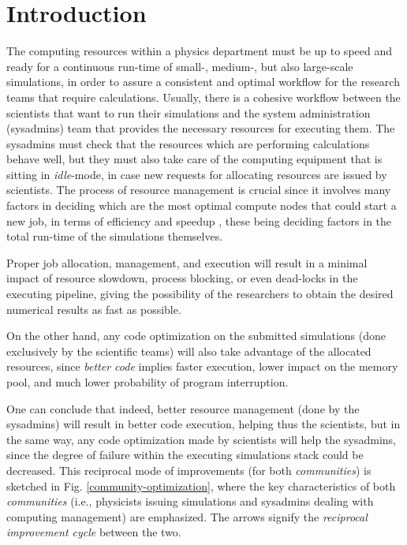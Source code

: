 \documentclass[conference]{IEEEtran}
\begin{document}
\section{Introduction}
\label{section-introduction}
The computing resources within a physics department must be up to speed and ready for a continuous run-time of small-, medium-, but also large-scale simulations, in order to assure a consistent and optimal workflow for the research teams that require calculations. Usually, there is a cohesive workflow between the scientists that want to run their simulations and the system administration (sysadmins) team that provides the necessary resources for executing them. The sysadmins must check that the resources which are performing calculations behave well, but they must also take care of the computing equipment that is sitting in \emph{idle}-mode, in case new requests for allocating resources are issued by scientists. The process of resource management is crucial since it involves many factors in deciding which are the most optimal compute nodes that could start a new job, in terms of efficiency and speedup \cite{paya2015resource}, these being deciding factors in the total run-time of the simulations themselves.
\par Proper job allocation, management, and execution will result in a minimal impact of resource slowdown, process blocking, or even dead-locks in the executing pipeline, giving the possibility of the researchers to obtain the desired numerical results as fast as possible. 
\par On the other hand, any code optimization \cite{codeoptimization2,codeoptimization1} on the submitted simulations (done exclusively by the scientific teams) will also take advantage of the allocated resources, since \emph{better code} implies faster execution, lower impact on the memory pool, and much lower probability of program interruption.
\par One can conclude that indeed, better resource management (done by the sysadmins) will result in better code execution, helping thus the scientists, but in the same way, any code optimization made by scientists will help the sysadmins, since the degree of failure within the executing simulations stack could be decreased. This reciprocal mode of improvements (for both \emph{communities}) is sketched in Fig. \ref{community-optimization}, where the key characteristics of both \emph{communities} (i.e., physicists issuing simulations and sysadmins dealing with computing management) are emphasized. The arrows signify the \emph{reciprocal improvement cycle} between the two.
\end{document}

